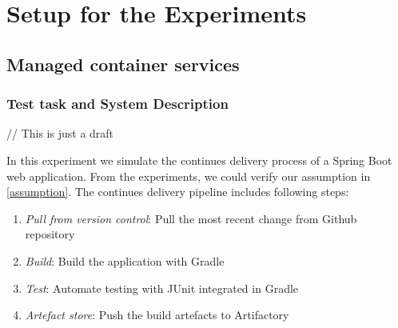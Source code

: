 \section{Setup for the Experiments}
\subsection{Managed container services}
\subsubsection{Test task and System Description}
// This is just a draft

In this experiment we simulate the continues delivery process of a Spring Boot web application. From the experiments, we could verify our assumption in \ref{assumption}.
The continues delivery pipeline includes following steps:
\begin{enumerate}
    \item \textit{Pull from version control}: Pull the most recent change from Github repository
    \item \textit{Build}: Build the application with Gradle
    \item \textit{Test}: Automate testing with JUnit integrated in Gradle
    \item \textit{Artefact store}: Push the build artefacts to Artifactory
\end{enumerate}
